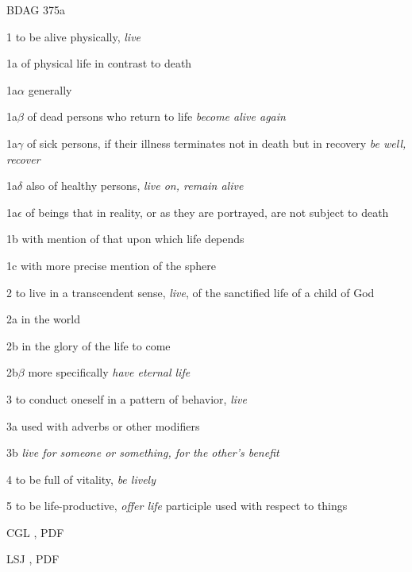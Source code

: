 				\begin{compactdesc}
					\item[BDAG 375a] \textbf{}
						\begin{compactitem}
							\item[1] to be alive physically, \textit{live}
							\item[1a] of physical life in contrast to death
							\item[1a$\alpha$] generally
							\item[1a$\beta$] of dead persons who return to life \textit{become alive again}
							\item[1a$\gamma$] of sick persons, if their illness terminates not in death but in recovery \textit{be well, recover}
							\item[1a$\delta$] also of healthy persons, \textit{live on, remain alive}
							\item[1a$\epsilon$] of beings that in reality, or as they are portrayed, are not subject to death
							\item[1b] with mention of that upon which life depends
							\item[1c] with more precise mention of the sphere
							\item[2] to live in a transcendent sense, \textit{live}, of the sanctified life of a child of God
							\item[2a] in the world
							\item[2b] in the glory of the life to come
							\item[2b$\beta$] more specifically  \textit{have eternal life}
							\item[3] to conduct oneself in a pattern of behavior, \textit{live}
							\item[3a] used with adverbs or other modifiers
							\item[3b] \textit{live for someone or something, for the other's benefit}
							\item[4] to be full of vitality, \textit{be lively}
							\item[5] to be life-productive, \textit{offer life} participle used with respect to things
						\end{compactitem}
					\item[CGL , PDF ] \textbf{}
						\begin{compactitem}
							\item 
						\end{compactitem}
					\item[LSJ , PDF ] \textbf{}
						\begin{compactitem}
							\item 
						\end{compactitem}
				\end{compactdesc}
				

